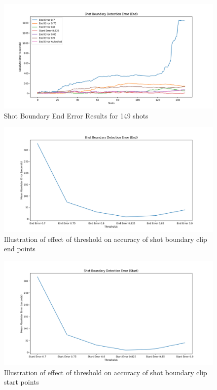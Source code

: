 \documentclass[12pt]{report}
\begin{document}
	\begin{figure}[h]  %
		\centering
		\includegraphics[width=\linewidth]{sbd_end_error.png}  %
		\caption{Shot Boundary End Error Results for 149 shots}
		\label{fig:sbd_end_error}
	\end{figure}
	\begin{figure}[h]  %
		\centering
		\includegraphics[width=\linewidth]{analysis_5.png}  %
		\caption{Illustration of effect of threshold on accuracy of shot boundary clip end points}
		\label{fig:sbd_analysis_end}
	\end{figure}
	\begin{figure}[h]  %
		\centering
		\includegraphics[width=\linewidth]{analysis_6.png}  %
		\caption{Illustration of effect of threshold on accuracy of shot boundary clip start points}
		\label{fig:sbd_analysis_start}
	\end{figure}
\end{document}
